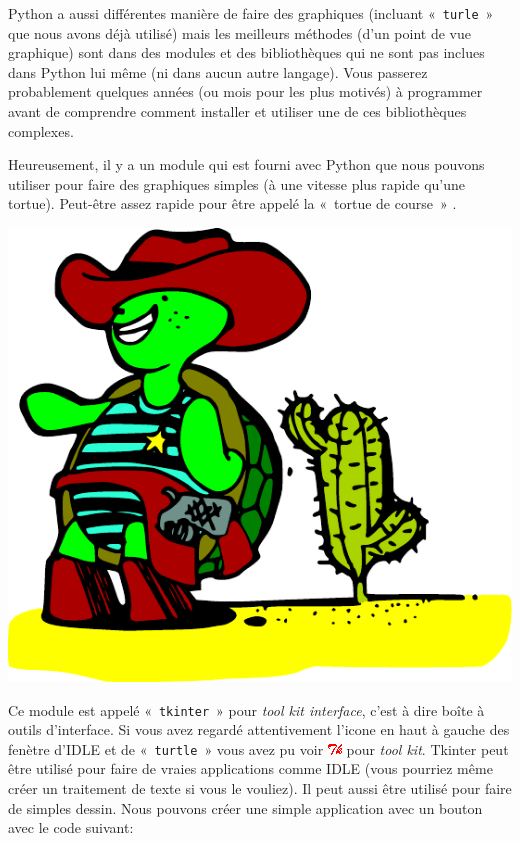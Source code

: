 Python a aussi différentes manière de faire des graphiques (incluant «~\texttt{turle}~»  que nous avons déjà utilisé) mais les meilleurs méthodes (d'un point de vue graphique) sont dans des modules et des bibliothèques qui ne sont pas inclues dans Python lui même (ni dans aucun autre langage).
Vous passerez probablement quelques années (ou mois pour les plus motivés) à programmer avant de comprendre comment installer et utiliser une de ces bibliothèques complexes.

Heureusement, il y a un module qui est fourni avec Python que nous pouvons utiliser pour faire des graphiques simples (à une vitesse plus rapide qu'une tortue). Peut-être assez rapide pour être appelé la «~tortue de course~» .
\begin{center}
\includegraphics[scale=1]{images/tortue_rapide}
\end{center}

Ce module est appelé «~\texttt{tkinter}~» pour \emph{tool kit interface}, c'est à dire boîte à outils d'interface.
Si vous avez regardé  attentivement l'icone en haut à gauche des fenètre d'IDLE et de «~\texttt{turtle}~» vous avez pu voir \includegraphics[scale=1]{images/tk} pour \emph{tool kit}. Tkinter peut être utilisé pour faire de vraies applications comme IDLE (vous pourriez même créer un traitement de texte si vous le vouliez). Il peut aussi être utilisé pour faire de simples dessin. Nous pouvons créer une simple application avec un bouton avec le code suivant:

